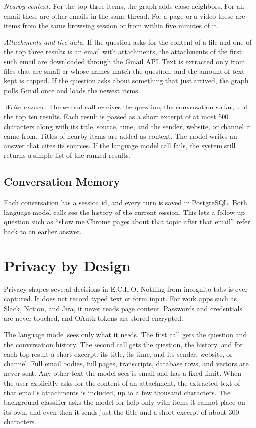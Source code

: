 \documentclass[conference]{IEEEtran}
\begin{document}
\textit{Nearby context.} For the top three items, the graph adds close neighbors. For an email these are other emails in the same thread. For a page or a video these are items from the same browsing session or from within five minutes of it.

\textit{Attachments and live data.} If the question asks for the content of a file and one of the top three results is an email with attachments, the attachments of the first such email are downloaded through the Gmail API. Text is extracted only from files that are small or whose names match the question, and the amount of text kept is capped. If the question asks about something that just arrived, the graph polls Gmail once and loads the newest items.

\textit{Write answer.} The second call receives the question, the conversation so far, and the top ten results. Each result is passed as a short excerpt of at most 500 characters along with its title, source, time, and the sender, website, or channel it came from. Titles of nearby items are added as context. The model writes an answer that cites its sources. If the language model call fails, the system still returns a simple list of the ranked results.

\subsection{Conversation Memory}
Each conversation has a session id, and every turn is saved in PostgreSQL. Both language model calls see the history of the current session. This lets a follow up question such as ``show me Chrome pages about that topic after that email'' refer back to an earlier answer.

\section{Privacy by Design}\label{sec:privacy}
Privacy shapes several decisions in E.C.H.O. Nothing from incognito tabs is ever captured. It does not record typed text or form input. For work apps such as Slack, Notion, and Jira, it never reads page content. Passwords and credentials are never touched, and OAuth tokens are stored encrypted.

The language model sees only what it needs. The first call gets the question and the conversation history. The second call gets the question, the history, and for each top result a short excerpt, its title, its time, and its sender, website, or channel. Full email bodies, full pages, transcripts, database rows, and vectors are never sent. Any other text the model sees is small and has a fixed limit. When the user explicitly asks for the content of an attachment, the extracted text of that email's attachments is included, up to a few thousand characters. The background classifier asks the model for help only with items it cannot place on its own, and even then it sends just the title and a short excerpt of about 300 characters.
\end{document}
